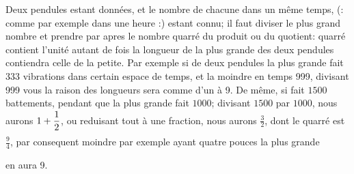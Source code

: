 	
	\vspace*{8mm}
	\pstart 
	\normalsize
	\noindent[56~r\textsuperscript{o}] Deux pendules\protect{}  estant donn\'{e}es, et le nombre  de chacune dans un m\^{e}me temps, (: comme par exemple dans une heure :) estant connu; il faut diviser le plus grand nombre  et prendre par apres le nombre quarr\'{e} du produit ou du quotient:  quarr\'{e} contient l'unit\'{e} autant de fois la longueur de la plus grande des deux pendules contiendra celle de la petite.
	\pend 
\pstart Par exemple si de deux pendules la plus grande fait 333 vibrations\protect{} dans  certain espace de temps, et la moindre en  temps 999, divisant 999 vous  la raison des longueurs sera comme d'un \`{a} 9.
\pend 
\count{}
\pstart
De m\^{e}me, si  fait $1500$ battements, pendant que la plus grande fait $\displaystyle1000$; divisant $\displaystyle1500$ par $\displaystyle1000$, nous aurons $1+\rule[-4mm]{0mm}{9mm}\displaystyle\frac{1}{2}$, ou reduisant tout \`{a} une fraction, nous aurons $\displaystyle\frac{3}{2}$, dont le quarr\'{e} est $\displaystyle\frac{9}{4}$, par consequent  moindre par exemple ayant quatre pouces la plus grande\rule[-4mm]{0mm}{9mm} en aura 9.
\pend
\pstart
